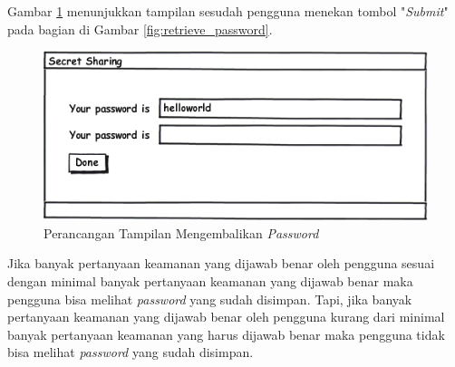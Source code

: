 Gambar \ref{fig:password} menunjukkan tampilan sesudah pengguna menekan tombol "\textit{Submit}" pada bagian di Gambar \ref{fig:retrieve_password}.

\begin{figure}[H]
	\centerline{\includegraphics[scale=0.5]{Gambar/password}}
	\caption{Perancangan Tampilan Mengembalikan \textit{Password}}\label{fig:password}
\end{figure}

Jika banyak pertanyaan keamanan yang dijawab benar oleh pengguna sesuai dengan minimal banyak pertanyaan keamanan yang dijawab benar maka pengguna bisa melihat \textit{password} yang sudah disimpan. Tapi, jika banyak pertanyaan keamanan yang dijawab benar oleh pengguna kurang dari minimal banyak pertanyaan keamanan yang harus dijawab benar maka pengguna tidak bisa melihat \textit{password} yang sudah disimpan.